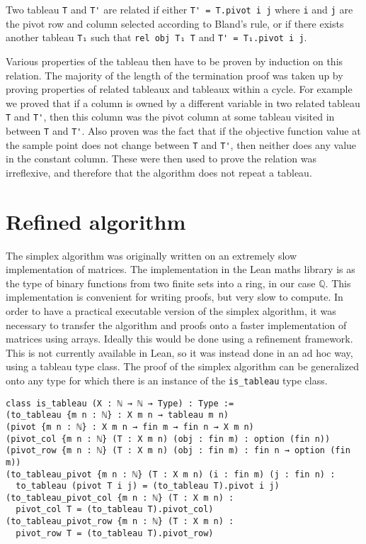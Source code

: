 \documentclass[11pt]{article} %
\begin{document}
Two tableau \lstinline|T| and \lstinline|T'| are related if either \lstinline|T' = T.pivot i j| where \lstinline|i| and \lstinline|j| are the pivot row and column selected according to Bland's rule, or if there exists another tableau \lstinline|T₁| such that \lstinline|rel obj T₁ T| and \lstinline|T' = T₁.pivot i j|.

Various properties of the tableau then have to be proven by induction on this relation. The majority of the length of the termination proof was taken up by proving properties of related tableaux and tableaux within a cycle. For example we proved that if a column is owned by a different variable in two related tableau \lstinline|T| and \lstinline|T'|, then this column was the pivot column at some tableau visited in between \lstinline|T| and \lstinline|T'|. Also proven was the fact that if the objective function value at the sample point does not change between \lstinline|T| and \lstinline|T'|, then neither does any value in the constant column. These were then used to prove the relation was irreflexive, and therefore that the algorithm does not repeat a tableau.

\section{Refined algorithm}

The simplex algorithm was originally written on an extremely slow implementation of matrices. The implementation in the Lean maths library \cite{community2019lean} is as the type of binary functions from two finite sets into a ring, in our case $\mathbb{Q}$. This implementation is convenient for writing proofs, but very slow to compute. In order to have a practical executable version of the simplex algorithm, it was necessary to transfer the algorithm and proofs onto a faster implementation of matrices using arrays. Ideally this would be done using a refinement framework.  This is not currently available in Lean, so it was instead done in an ad hoc way, using a tableau type class. The proof of the simplex algorithm can be generalized onto any type for which there is an instance of the \lstinline|is_tableau| type class.

\begin{lstlisting}
class is_tableau (X : ℕ → ℕ → Type) : Type :=
(to_tableau {m n : ℕ} : X m n → tableau m n)
(pivot {m n : ℕ} : X m n → fin m → fin n → X m n)
(pivot_col {m n : ℕ} (T : X m n) (obj : fin m) : option (fin n))
(pivot_row {m n : ℕ} (T : X m n) (obj : fin m) : fin n → option (fin m))
(to_tableau_pivot {m n : ℕ} (T : X m n) (i : fin m) (j : fin n) :
  to_tableau (pivot T i j) = (to_tableau T).pivot i j)
(to_tableau_pivot_col {m n : ℕ} (T : X m n) :
  pivot_col T = (to_tableau T).pivot_col)
(to_tableau_pivot_row {m n : ℕ} (T : X m n) :
  pivot_row T = (to_tableau T).pivot_row)
\end{lstlisting}
\end{document}
